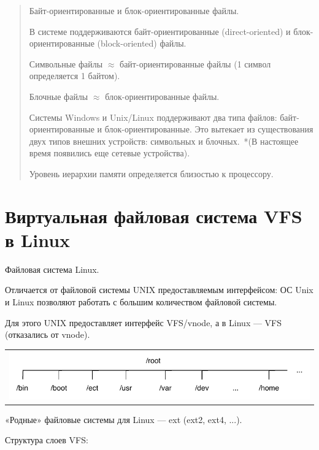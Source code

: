 \begin{quote}
Байт-ориентированные и блок-ориентированные файлы.

В системе поддерживаются байт-ориентированные (direct-oriented) и блок-ориентированные (block-oriented) файлы.

Символьные файлы $\approx$ байт-ориентированные файлы (1 символ определяется 1 байтом).

Блочные файлы $\approx$ блок-ориентированные файлы.

Системы Windows и Unix/Linux поддерживают два типа файлов: байт-ориентированные и блок-ориентированные. Это вытекает из существования двух типов внешних устройств: символьных и блочных. *(В настоящее время появились еще сетевые устройства).

Уровень иерархии памяти определяется близостью к процессору.
\end{quote}

\section{Виртуальная файловая система VFS в Linux}

Файловая система Linux.

Отличается от файловой системы UNIX предоставляемым интерфейсом: ОС Unix и Linux позволяют работать с большим количеством файловой системы.

Для этого UNIX предоставляет интерфейс VFS/vnode, а в Linux — VFS (отказались от vnode).

\begin{table}[h!]
  \centering
  \begin{tabular}{p{1\linewidth}}
    \centering
    \includegraphics[width=0.8\linewidth]{./images/root.pdf}
  \end{tabular}
\end{table}

«Родные» файловые системы для Linux — ext (ext2, ext4, ...).

Структура слоев VFS:

